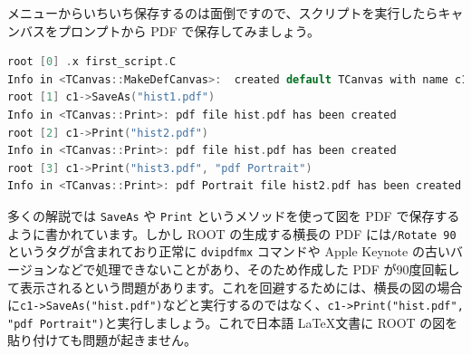 メニューからいちいち保存するのは面倒ですので、スクリプトを実行したらキャンバスをプロンプトから PDF で保存してみましょう。

\begin{lstlisting}[language=c++]
root [0] .x first_script.C
Info in <TCanvas::MakeDefCanvas>:  created default TCanvas with name c1
root [1] c1->SaveAs("hist1.pdf")
Info in <TCanvas::Print>: pdf file hist.pdf has been created
root [2] c1->Print("hist2.pdf")
Info in <TCanvas::Print>: pdf file hist.pdf has been created
root [3] c1->Print("hist3.pdf", "pdf Portrait")
Info in <TCanvas::Print>: pdf Portrait file hist2.pdf has been created
\end{lstlisting}

多くの解説では \texttt{SaveAs} や \texttt{Print} というメソッドを使って図を PDF で保存するように書かれています。しかし ROOT の生成する横長の PDF には\texttt{/Rotate 90}というタグが含まれており正常に \texttt{dvipdfmx} コマンドや Apple Keynote の古いバージョンなどで処理できないことがあり、そのため作成した PDF が90度回転して表示されるという問題があります。これを回避するためには、横長の図の場合に\texttt{c1->SaveAs("hist.pdf")}などと実行するのではなく、\texttt{c1->Print("hist.pdf", "pdf Portrait")}と実行しましょう。これで日本語 \LaTeX 文書に ROOT の図を貼り付けても問題が起きません。

